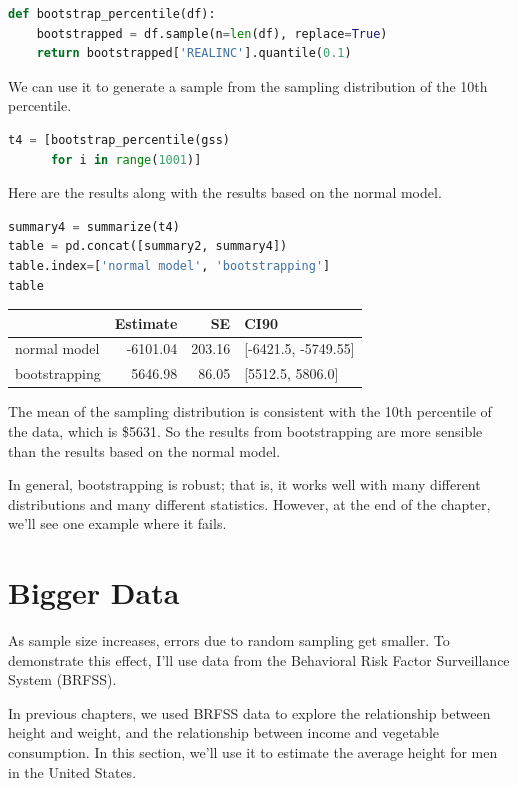 \begin{lstlisting}[language=Python]
def bootstrap_percentile(df):
    bootstrapped = df.sample(n=len(df), replace=True)
    return bootstrapped['REALINC'].quantile(0.1)
\end{lstlisting}

We can use it to generate a sample from the sampling distribution of the
10th percentile.

\begin{lstlisting}[language=Python]
t4 = [bootstrap_percentile(gss)
      for i in range(1001)]
\end{lstlisting}

Here are the results along with the results based on the normal model.

\begin{lstlisting}[language=Python]
summary4 = summarize(t4)
table = pd.concat([summary2, summary4])
table.index=['normal model', 'bootstrapping']
table
\end{lstlisting}

\begin{tabular}{lrrl}
\toprule
{} &  Estimate &      SE &                 CI90 \\
\midrule
normal model  &  -6101.04 &  203.16 &  [-6421.5, -5749.55] \\
bootstrapping &   5646.98 &   86.05 &     [5512.5, 5806.0] \\
\bottomrule
\end{tabular}

The mean of the sampling distribution is consistent with the 10th
percentile of the data, which is \$5631. So the results from
bootstrapping are more sensible than the results based on the normal
model.

In general, bootstrapping is robust; that is, it works well with many
different distributions and many different statistics. However, at the
end of the chapter, we'll see one example where it fails.

\hypertarget{bigger-data}{%
\section{Bigger Data}\label{bigger-data}}

As sample size increases, errors due to random sampling get smaller. To
demonstrate this effect, I'll use data from the Behavioral Risk Factor
Surveillance System (BRFSS).

In previous chapters, we used BRFSS data to explore the relationship
between height and weight, and the relationship between income and
vegetable consumption. In this section, we'll use it to estimate the
average height for men in the United States.

